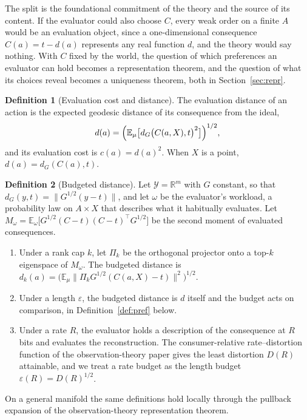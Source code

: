 \documentclass[11pt]{article}
\theoremstyle{definition}
\newtheorem{definition}{Definition}
\theoremstyle{remark}
\newcommand{\Y}{\mathcal{Y}}
\newcommand{\Ex}{\mathbb{E}}
\newcommand{\R}{\mathbb{R}}
\newcommand{\dG}{d_{G}}
\begin{document}
The split is the foundational commitment of the theory and the source of its content.
If the evaluator could also choose $C$, every weak order on a finite $A$ would be an evaluation object, since a one-dimensional consequence $C(a)=t-d(a)$ represents any real function $d$, and the theory would say nothing.
With $C$ fixed by the world, the question of which preferences an evaluator can hold becomes a representation theorem, and the question of what its choices reveal becomes a uniqueness theorem, both in Section~\ref{sec:repr}.

\begin{definition}[Evaluation cost and distance]
\label{def:cost}
The evaluation distance of an action is the expected geodesic distance of its consequence from the ideal,
\[
d(a)=\Bigl(\Ex_{\mu}\bigl[\dG\bigl(C(a,X),t\bigr)^{2}\bigr]\Bigr)^{1/2},
\]
and its evaluation cost is $c(a)=d(a)^{2}$.
When $X$ is a point, $d(a)=\dG(C(a),t)$.
\end{definition}

\begin{definition}[Budgeted distance]
\label{def:budget}
Let $\Y=\R^{m}$ with $G$ constant, so that $\dG(y,t)=\|G^{1/2}(y-t)\|$, and let $\omega$ be the evaluator's workload, a probability law on $A\times X$ that describes what it habitually evaluates.
Let $M_{\omega}=\Ex_{\omega}\bigl[G^{1/2}(C-t)(C-t)^{\top}G^{1/2}\bigr]$ be the second moment of evaluated consequences.
\begin{enumerate}
\item[(i)] Under a rank cap $k$, let $\Pi_{k}$ be the orthogonal projector onto a top-$k$ eigenspace of $M_{\omega}$. The budgeted distance is $d_{k}(a)=\bigl(\Ex_{\mu}\|\Pi_{k}G^{1/2}(C(a,X)-t)\|^{2}\bigr)^{1/2}$.
\item[(ii)] Under a length $\varepsilon$, the budgeted distance is $d$ itself and the budget acts on comparison, in Definition~\ref{def:pref} below.
\item[(iii)] Under a rate $R$, the evaluator holds a description of the consequence at $R$ bits and evaluates the reconstruction. The consumer-relative rate--distortion function of the observation-theory paper gives the least distortion $D(R)$ attainable, and we treat a rate budget as the length budget $\varepsilon(R)=D(R)^{1/2}$.
\end{enumerate}
On a general manifold the same definitions hold locally through the pullback expansion of the observation-theory representation theorem.
\end{definition}
\end{document}

